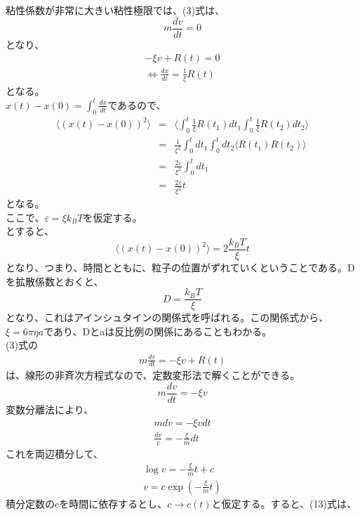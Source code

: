 \documentclass[10pt]{jreport}
\begin{document}
粘性係数が非常に大きい粘性極限では、(3)式は、
\begin{equation}
m\frac{dv}{dt}=0
\end{equation}
となり、
\begin{eqnarray}
-\xi v+R(t) =0 \nonumber \\
\Leftrightarrow \frac{dx}{dt}=\frac{1}{\xi}R(t)
\end{eqnarray}
となる。\\
$x(t)-x(0)=\int^t_0 \frac{dx}{dt}$であるので、
\begin{eqnarray}
\langle (x(t)-x(0))^2\rangle &=& \langle \int^t_0\frac{1}{\xi}R(t_1)dt_1\int^t_0\frac{1}{\xi}R(t_2)dt_2\rangle \nonumber \\
&=& \frac{1}{\xi ^2} \int^t_0dt_1 \int^t_0dt_2\langle R(t_1)R(t_2)\rangle \nonumber \\
&=& \frac{2\varepsilon}{\xi ^2}\int^t_0dt_1\nonumber \\
&=& \frac{2\varepsilon}{\xi^2} t 
\end{eqnarray}
となる。\\
ここで、$\varepsilon=\xi k_B T$を仮定する。\\
とすると、
\begin{equation}
\langle (x(t)-x(0))^2 \rangle =2 \frac{k_BT}{\xi}t
\end{equation}
となり、つまり、時間とともに、粒子の位置がずれていくということである。Dを拡散係数とおくと、
\begin{equation}
D=\frac{k_BT}{\xi}
\end{equation}
となり、これはアインシュタインの関係式を呼ばれる。この関係式から、$\xi = 6\pi \eta a$であり、Dとaは反比例の関係にあることもわかる。\\
(3)式の
\begin{eqnarray}
m\frac{dv}{dt}=-\xi v +R(t) \nonumber
\end{eqnarray}
は、線形の非斉次方程式なので、定数変形法で解くことができる。
\begin{equation}
m\frac{dv}{dt}=-\xi v
\end{equation}
変数分離法により、
\begin{eqnarray}
mdv = -\xi v dt \nonumber \\
\frac{dv}{v} = -\frac{\xi}{m} dt 
\end{eqnarray}
これを両辺積分して、
\begin{eqnarray}
\log v = -\frac{\xi}{m}t + c\nonumber \\
v = c\exp(-\frac{\xi}{m}t)
\end{eqnarray}
積分定数のcを時間に依存するとし、$c \rightarrow c(t)$と仮定する。すると、(13)式は、
\end{document}

